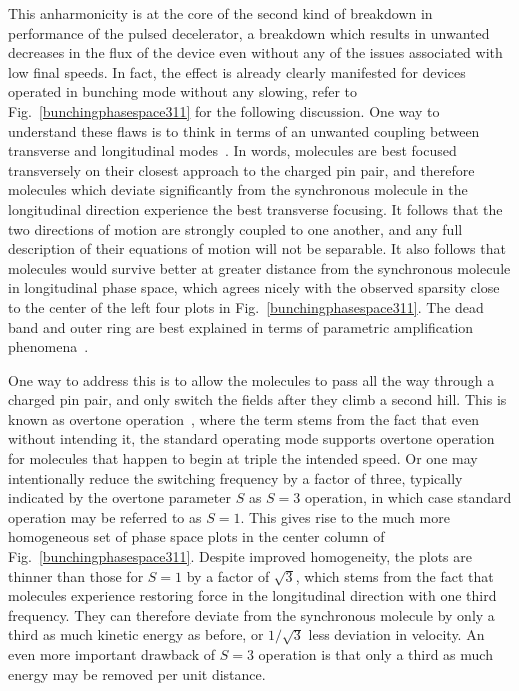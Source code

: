 This anharmonicity is at the core of the second kind of breakdown in performance of the pulsed decelerator, a breakdown which results in unwanted decreases in the flux of the device even without any of the issues associated with low final speeds.
In fact, the effect is already clearly manifested for devices operated in bunching mode without any slowing, refer to Fig.~\ref{bunchingphasespace311} for the following discussion.
One way to understand these flaws is to think in terms of an unwanted coupling between transverse and longitudinal modes~\cite{VanDeMeerakker2006}.
In words, molecules are best focused transversely on their closest approach to the charged pin pair, and therefore molecules which deviate significantly from the synchronous molecule in the longitudinal direction experience the best transverse focusing.
It follows that the two directions of motion are strongly coupled to one another, and any full description of their equations of motion will not be separable.
It also follows that molecules would survive better at greater distance from the synchronous molecule in longitudinal phase space, which agrees nicely with the observed sparsity close to the center of the left four plots in Fig.~\ref{bunchingphasespace311}.
The dead band and outer ring are best explained in terms of parametric amplification phenomena~\cite{VanDeMeerakker2006}.

One way to address this is to allow the molecules to pass all the way through a charged pin pair, and only switch the fields after they climb a second hill.
This is known as overtone operation~\cite{VanDeMeerakker2005a}, where the term stems from the fact that even without intending it, the standard operating mode supports overtone operation for molecules that happen to begin at triple the intended speed.
Or one may intentionally reduce the switching frequency by a factor of three, typically indicated by the overtone parameter $S$ as $S=3$ operation, in which case standard operation may be referred to as $S=1$.
This gives rise to the much more homogeneous set of phase space plots in the center column of Fig.~\ref{bunchingphasespace311}.
Despite improved homogeneity, the plots are thinner than those for $S=1$ by a factor of $\sqrt{3}$, which stems from the fact that molecules experience restoring force in the longitudinal direction with one third frequency. 
They can therefore deviate from the synchronous molecule by only a third as much kinetic energy as before, or $1/\sqrt{3}$ less deviation in velocity.
An even more important drawback of $S=3$ operation is that only a third as much energy may be removed per unit distance.

